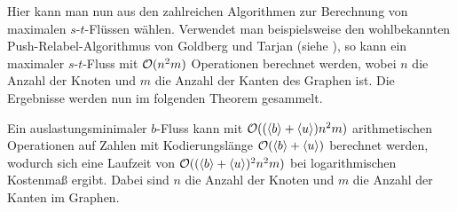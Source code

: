 Hier kann man nun aus den zahlreichen Algorithmen zur Berechnung von maximalen $s$-$t$-Flüssen wählen.
Verwendet man beispielsweise den wohlbekannten Push-Relabel-Algorithmus von Goldberg und Tarjan (siehe \cite[Satz 8.30]{Korte2012}), so kann ein maximaler $s$-$t$-Fluss mit $\mathcal{O}(n^2 m)$ Operationen berechnet werden, wobei $n$ die Anzahl der Knoten und $m$ die Anzahl der Kanten des Graphen ist.
Die Ergebnisse werden nun im folgenden Theorem gesammelt.

\begin{theorem}\label{thm-compute-minimal-con-flow}
	Ein auslastungsminimaler $b$-Fluss kann mit $\mathcal{O}((\langle b\rangle+\langle u\rangle) n^2 m)$ arithmetischen Operationen auf Zahlen mit Kodierungslänge $\mathcal{O}(\langle b\rangle + \langle u\rangle)$ berechnet werden, wodurch sich eine Laufzeit von $\mathcal{O}((\langle b\rangle+\langle u\rangle)^2 n^2 m)$ bei logarithmischen Kostenmaß ergibt.
	Dabei sind $n$ die Anzahl der Knoten und $m$ die Anzahl der Kanten im Graphen.
\end{theorem}